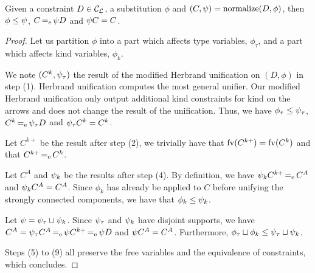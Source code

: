 \begin{lemma}
  \label{lemma:normalform}
  Given a constraint $D\in{\mathcal C_{\mathcal L}}$, a substitution $\phi$ and
  $(C,\mathrm{\psi}) = \operatorname{normalize}(D,\phi)$,
  then $\phi\leq\mathrm{\psi}$,
  $C \operatorname{=_e} \mathrm{\psi} D$ and
  $\mathrm{\psi} C = C$.
\end{lemma}
\begin{proof}
  Let us partition $\phi$ into a part which affects type variables,
  $\phi_\tau$, and a part which affects kind variables, $\phi_k$.
  
  We note $(C^k,\mathrm{\psi}_\tau)$ the result of
  the modified Herbrand unification on $(D,\phi)$ in step (1).
  Herbrand unification computes the most general
  unifier. Our modified Herbrand unification only output additional
  kind constraints for kind on the arrows and does not change
  the result of the unification. Thus, we have
  $\phi_\tau\leq\mathrm{\psi}_\tau$,
  $C^k \operatorname{=_e} \mathrm{\psi}_\tau D$ and
  $\mathrm{\psi}_\tau C^k = C^k$.
  
  Let $C^{k+}$ be the result after step (2), we trivially have that
  $\operatorname{fv}(C^{k+}) = \operatorname{fv}(C^k)$ and that $C^{k+} \operatorname{=_e} C^k$.

  Let $C^{A}$ and $\mathrm{\psi}_k$ be the results after step (4).
  By definition, we have $\mathrm{\psi}_k C^{k+} \operatorname{=_e} C^{A}$ and
  $\mathrm{\psi}_k C^{A} = C^{A}$. Since $\phi_k$ has already be applied to $C$ before
  unifying the strongly connected components,
  we have that $\phi_k\leq\mathrm{\psi}_k$.

  Let $\mathrm{\psi} = \mathrm{\psi}_\tau \sqcup \mathrm{\psi}_k$. Since $\mathrm{\psi}_\tau$ and $\mathrm{\psi}_k$
  have disjoint supports,
  we have $C^{A} = \mathrm{\psi}_\tau C^{A} \operatorname{=_e} \mathrm{\psi} C^{k+} \operatorname{=_e} \mathrm{\psi} D$
  and $\mathrm{\psi} C^{A} = C^{A}$.
  Furthermore, $\phi_\tau \sqcup \phi_k \leq \mathrm{\psi}_\tau \sqcup \mathrm{\psi}_k$.
  
  Steps (5) to (9) all preserve the free variables and the equivalence
  of constraints, which concludes.
\end{proof}

